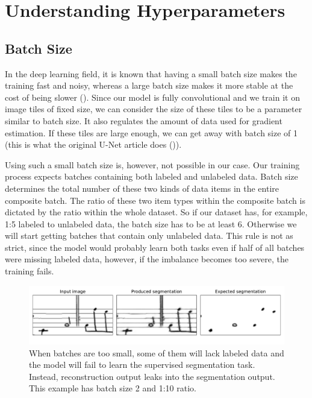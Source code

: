 \section{Understanding Hyperparameters}
\label{sec:UnderstandingHyperparameters}


\subsection{Batch Size}
\label{sec:BatchSize}

In the deep learning field, it is known that having a small batch size makes the training fast and noisy, whereas a large batch size makes it more stable at the cost of being slower (\cite{DeepLearningBook}). Since our model is fully convolutional and we train it on image tiles of fixed size, we can consider the size of these tiles to be a parameter similar to batch size. It also regulates the amount of data used for gradient estimation. If these tiles are large enough, we can get away with batch size of 1 (this is what the original U-Net article does (\cite{UNet})).

Using such a small batch size is, however, not possible in our case. Our training process expects batches containing both labeled and unlabeled data. Batch size determines the total number of these two kinds of data items in the entire composite batch. The ratio of these two item types within the composite batch is dictated by the ratio within the whole dataset. So if our dataset has, for example, 1:5 labeled to unlabeled data, the batch size has to be at least 6. Otherwise we will start getting batches that contain only unlabeled data. This rule is not as strict, since the model would probably learn both tasks even if half of all batches were missing labeled data, however, if the imbalance becomes too severe, the training fails.

\begin{figure}[ht]
    \centering
    \includegraphics[width=140mm]{../../figures/07-small-batches/small-batches.pdf}
    \caption{When batches are too small, some of them will lack labeled data and the model will fail to learn the supervised segmentation task. Instead, reconstruction output leaks into the segmentation output. This example has batch size 2 and 1:10 ratio.}
    \label{fig:SmallBatches}
\end{figure}

